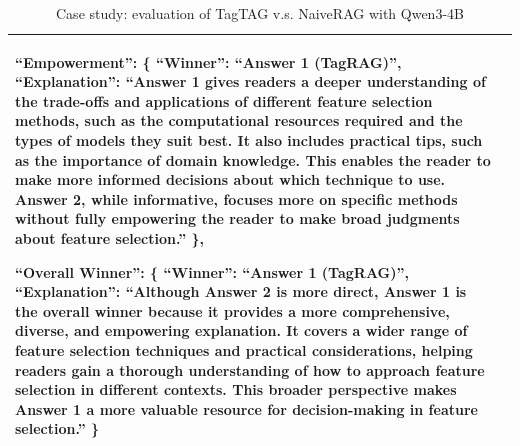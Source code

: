 \documentclass[11pt]{article}
\begin{document}
\begin{table}[h]
\begin{tabularx}{\textwidth}{p{2cm}|X}
    \textbf{``Empowerment''}: \{ ``Winner'': ``Answer 1 (TagRAG)'', ``Explanation'': ``Answer 1 gives readers a deeper understanding of the trade-offs and applications of different feature selection methods, such as the computational resources required and the types of models they suit best. It also includes practical tips, such as the importance of domain knowledge. This enables the reader to make more informed decisions about which technique to use. Answer 2, while informative, focuses more on specific methods without fully empowering the reader to make broad judgments about feature selection.'' \},
    
    \textbf{``Overall Winner''}: \{ ``Winner'': ``Answer 1 (TagRAG)'', ``Explanation'': ``Although Answer 2 is more direct, Answer 1 is the overall winner because it provides a more comprehensive, diverse, and empowering explanation. It covers a wider range of feature selection techniques and practical considerations, helping readers gain a thorough understanding of how to approach feature selection in different contexts. This broader perspective makes Answer 1 a more valuable resource for decision-making in feature selection.'' \} \\

    \bottomrule
\end{tabularx}
\caption{Case study: evaluation of TagTAG v.s. NaiveRAG with Qwen3-4B}
\label{tab:TagTAG v.s. NaiveRAG}
\end{table}
\end{document}
